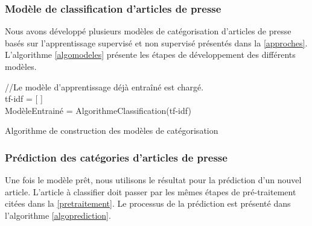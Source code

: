         \subsubsection{Modèle de classification d'articles de presse}
            Nous avons développé plusieurs modèles de catégorisation d'articles de presse basés sur l'apprentissage supervisé et non supervisé présentés dans la \autoref{approches}. L'algorithme \autoref{algomodeles} présente les étapes de développement des différents modèles.

            \begin{algorithm2e}[H]
            \label{algomodeles}
            \SetAlgoLined
             //Le modèle d'apprentissage déjà entraîné est chargé. \\
            tf-idf = [ ]\\
            ModèleEntrainé = AlgorithmeClassification(tf-idf)\\
            \caption{Algorithme de construction des modèles de catégorisation}
            \end{algorithm2e}

        \subsubsection{Prédiction des catégories d'articles de presse}
            Une fois le modèle prêt, nous utilisons le résultat pour la prédiction d'un nouvel article. L'article à classifier doit passer par les mêmes étapes de pré-traitement citées dans la \autoref{pretraitement}. Le processus de la prédiction est présenté dans l'algorithme \autoref{algoprediction}.

